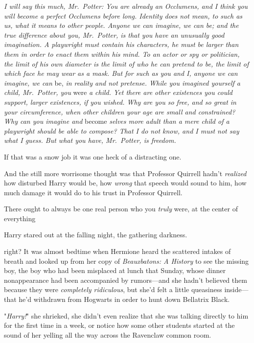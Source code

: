 \emph{I will say this much, Mr.~Potter: You are already an Occlumens, and I
think you will become a perfect Occlumens before long. Identity does not mean,
to such as us, what it means to other people. Anyone we can imagine, we can be;
and the true difference about you, Mr.~Potter, is that you have an unusually
good imagination. A playwright must contain his characters, he must be larger
than them in order to enact them within his mind. To an actor or spy or
politician, the limit of his own diameter is the limit of who he can pretend to
be, the limit of which face he may wear as a mask. But for such as you and I,
anyone we can imagine, we can} be, \emph{in reality and not pretense. While you
imagined yourself a child, Mr.~Potter, you} were \emph{a child. Yet there are
other existences you could support, larger existences, if you wished. Why are
you so free, and so great in your circumference, when other children your age
are small and constrained? Why can you imagine and} become \emph{selves more
adult than a mere child of a playwright should be able to compose? That I do
not know, and I must not say what I guess. But what you have, Mr.~Potter, is
freedom.}

If that was a snow job it was one heck of a distracting one.

And the still more worrisome thought was that Professor Quirrell hadn't
\emph{realized} how disturbed Harry would be, how \emph{wrong} that speech
would sound to him, how much damage it would do to his trust in Professor
Quirrell.

There ought to always be one real person who you \emph{truly} were, at the
center of everything{\el}

Harry stared out at the falling night, the gathering darkness.

{\el} right?
\sbreak
It was almost bedtime when Hermione heard the scattered intakes of breath and
looked up from her copy of \emph{Beauxbatons: A History} to see the missing
boy, the boy who had been misplaced at lunch that Sunday, whose dinner
nonappearance had been accompanied by rumors—and she hadn't believed them
because they were \emph{completely ridiculous}, but she'd felt a little
queasiness inside—that he'd withdrawn from Hogwarts in order to hunt down
Bellatrix Black.

"\emph{Harry!}" she shrieked, she didn't even realize that she was talking
directly to him for the first time in a week, or notice how some other students
started at the sound of her yelling all the way across the Ravenclaw common
room.

